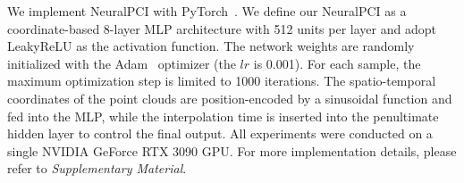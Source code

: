 \documentclass[10pt,twocolumn,letterpaper]{article}
\begin{document}
We implement NeuralPCI with PyTorch~\cite{paszke2019pytorch}. We define our NeuralPCI as a coordinate-based 8-layer MLP architecture with 512 units per layer and adopt LeakyReLU as the activation function. The network weights are randomly initialized with the Adam~\cite{kingma2014adam} optimizer (the $lr$ is 0.001). For each sample, the maximum optimization step is limited to 1000 iterations. The spatio-temporal coordinates of the point clouds are position-encoded by a sinusoidal function and fed into the MLP, while the interpolation time is inserted into the penultimate hidden layer to control the final output. All experiments were conducted on a single NVIDIA GeForce RTX 3090 GPU. For more implementation details, please refer to \textit{Supplementary Material}.
\end{document}
